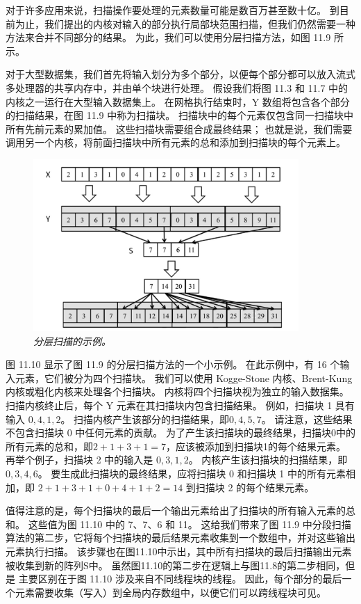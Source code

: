 对于许多应用来说，扫描操作要处理的元素数量可能是数百万甚至数十亿。 
到目前为止，我们提出的内核对输入的部分执行局部块范围扫描，但我们仍然需要一种方法来合并不同部分的结果。 
为此，我们可以使用分层扫描方法，如图 11.9 所示。

对于大型数据集，我们首先将输入划分为多个部分，以便每个部分都可以放入流式多处理器的共享内存中，并由单个块进行处理。 
假设我们将图 11.3 和 11.7 中的内核之一运行在大型输入数据集上。 
在网格执行结束时，$\mathrm{Y}$ 数组将包含各个部分的扫描结果，在图 11.9 中称为扫描块。 
扫描块中的每个元素仅包含同一扫描块中所有先前元素的累加值。 
这些扫描块需要组合成最终结果； 也就是说，我们需要调用另一个内核，将前面扫描块中所有元素的总和添加到扫描块的每个元素上。

\begin{figure}[H]
	\centering
	\includegraphics[width=0.9\textwidth]{figs/F11.10.png}
	\caption{\textit{分层扫描的示例。}}
\end{figure}

图 11.10 显示了图 11.9 的分层扫描方法的一个小示例。 在此示例中，有 16 个输入元素，它们被分为四个扫描块。 
我们可以使用 Kogge-Stone 内核、Brent-Kung 内核或粗化内核来处理各个扫描块。 内核将四个扫描块视为独立的输入数据集。 
扫描内核终止后，每个 Y 元素在其扫描块内包含扫描结果。 例如，扫描块 1 具有输入 $0,4,1,2$。 
扫描内核产生该部分的扫描结果，即$0,4,5,7$。 请注意，这些结果不包含扫描块 0 中任何元素的贡献。 
为了产生该扫描块的最终结果，扫描块0中的所有元素的总和，即$2+1+3+1=7$，应该被添加到扫描块1的每个结果元素。 
再举个例子，扫描块 2 中的输入是 $0,3,1,2$。 内核产生该扫描块的扫描结果，即$0,3,4,6$。 
要生成此扫描块的最终结果，应将扫描块 0 和扫描块 1 中的所有元素相加，即 $2+1+3+1+0+4+1+2=14$ 到扫描块 2 的每个结果元素。

值得注意的是，每个扫描块的最后一个输出元素给出了扫描块的所有输入元素的总和。 这些值为图 11.10 中的 7、7、6 和 11。 
这给我们带来了图 11.9 中分段扫描算法的第二步，它将每个扫描块的最后结果元素收集到一个数组中，并对这些输出元素执行扫描。 
该步骤也在图11.10中示出，其中所有扫描块的最后扫描输出元素被收集到新的阵列S中。
虽然图11.10的第二步在逻辑上与图11.8的第二步相同，但是 主要区别在于图 11.10 涉及来自不同线程块的线程。 
因此，每个部分的最后一个元素需要收集（写入）到全局内存数组中，以便它们可以跨线程块可见。

